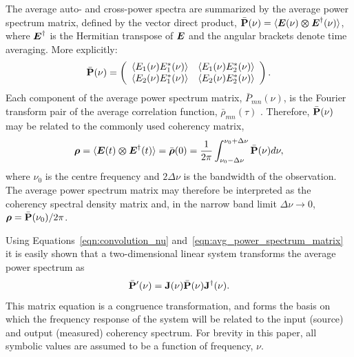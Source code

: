 \documentclass[twocolumn]{aastex6}
\newcommand{\mbf}[1]{\mbox{\boldmath $#1$}}
\begin{document}
\begin{appendix}
The average auto- and cross-power spectra are summarized by the
average power spectrum matrix, defined by the vector direct product,
\mbox{$\bar{\bf{P}}(\nu)
=\langle\mbf{E}(\nu)\boldsymbol{\otimes}\mbf{E}^\dagger(\nu)\rangle$},
where $\mbf{E}^\dagger$ is the Hermitian transpose of $\mbf{E}$ and
the angular brackets denote time averaging.  More explicitly:
\begin{equation}
\bar{\bf{P}}(\nu)=
  \left( 
    \begin{array}{cc}
      \langle E_1(\nu)E_1^*(\nu)\rangle & \langle E_1(\nu)E_2^*(\nu)\rangle \\
      \langle E_2(\nu)E_1^*(\nu)\rangle & \langle E_2(\nu)E_2^*(\nu)\rangle
    \end{array}
  \right).
\label{eqn:avg_power_spectrum_matrix}
\end{equation}
Each component of the average power spectrum matrix,
$\bar{P}_{mn}(\nu)$, is the Fourier transform pair of the average
correlation function, $\bar{\rho}_{mn}(\tau)$ \citep{pap65}.
Therefore, $\bar{\bf{P}}(\nu)$ may be related to the commonly used
coherency matrix,
\begin{equation}
\boldsymbol{\rho}=
	\langle\mbf{E}(t)\boldsymbol{\otimes}\mbf{E}^\dagger(t)\rangle
=\bar{\boldsymbol{\rho}}(0)
={1\over2\pi}\int_{\nu_0-\Delta\nu}^{\nu_0+\Delta\nu}{\bar{\bf{P}}(\nu)}d\nu,
\label{eqn:coherency_matrix}
\end{equation}
where $\nu_0$ is the centre frequency and $2\Delta\nu$ is the
bandwidth of the observation.  The average power spectrum matrix may
therefore be interpreted as the coherency spectral density matrix and,
in the narrow band limit $\Delta\nu\rightarrow0$,
$\boldsymbol{\rho}=\bar{\bf{P}}(\nu_0)/2\pi$.

Using Equations~\ref{eqn:convolution_nu}
and~\ref{eqn:avg_power_spectrum_matrix} it is easily shown that a
two-dimensional linear system transforms the average power spectrum as
\begin{equation}
{\bar{\bf{P}}^\prime}(\nu)={\bf{J}}(\nu)\bar{\bf{P}}(\nu){\bf{J}}^\dagger(\nu).
\label{eqn:congruence_transformation}
\end{equation}
This matrix equation is a congruence transformation, and forms the
basis on which the frequency response of the system will be related to
the input (source) and output (measured) coherency spectrum.  For
brevity in this paper, all symbolic values are
assumed to be a function of frequency, $\nu$.


\end{appendix}
\end{document}
